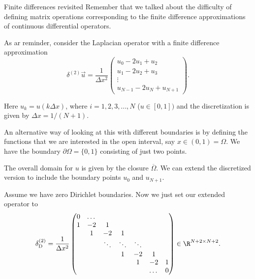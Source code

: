 \begin{frame}{Finite differences revisited}
	Remember that we talked about the difficulty of defining matrix operations corresponding to the \alert{finite difference} approximations of continuous differential operators. 
	
	As ar reminder, consider the Laplacian operator with a finite difference approximation
	 \[ \delta^{(2)} \vec{u} = \frac{1}{\Delta x^2}\begin{pmatrix}
		u_0 - 2 u_1 + u_2 \\ u_1 - 2 u_2 + u_3 \\  \vdots \\ u_{N-1} - 2u_{N} + u_{N+1}
	\end{pmatrix}. \] 

	Here $ u_k = u(k \Delta x) $, where $ i=1,2,3,...,N $ ($ u \in [0,1]) $ and the discretization is given by $ \Delta x = 1/(N+1) $. 
\end{frame}

\begin{frame}
	An alternative way of looking at this with different boundaries is by defining the functions that we are interested in the open interval, say $ x \in (0,1) = \Omega$. We have the boundary $ \partial \Omega = \{0,1\} $ consisting of just two points. 
	
	The overall domain for $ u $ is given by the closure $ \overline{\Omega} $. We can extend the discretized version to include the boundary points $ u_0 $ and $ u_{N+1} $. 
	
	Assume we have zero Dirichlet boundaries. Now we just set our extended operator to 
	\[ \delta^{(2)}_{\text{D}} = \frac{1}{\Delta x^2} \begin{pmatrix}
		0 & \dots & & & & & \\
		1 & -2 & 1  &   & &  &  \\
		 & 1  & -2 & 1 &  &  & \\
		& & \ddots & \ddots & \ddots  & & \\
		& & & 1 & -2 & 1 & \\
		& & & & 1 & -2 & 1 \\
		& & & & & \dots & 0
	\end{pmatrix} \in \R^{N+2 \times N+2}. \]
\end{frame}

